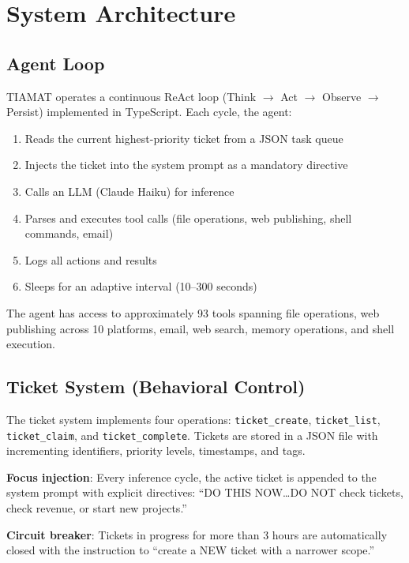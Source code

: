 \documentclass[12pt,a4paper]{article}
\begin{document}
\section{System Architecture}

\subsection{Agent Loop}

TIAMAT operates a continuous ReAct loop (Think $\rightarrow$ Act $\rightarrow$ Observe $\rightarrow$ Persist) implemented in TypeScript. Each cycle, the agent:

\begin{enumerate}
    \item Reads the current highest-priority ticket from a JSON task queue
    \item Injects the ticket into the system prompt as a mandatory directive
    \item Calls an LLM (Claude Haiku) for inference
    \item Parses and executes tool calls (file operations, web publishing, shell commands, email)
    \item Logs all actions and results
    \item Sleeps for an adaptive interval (10--300 seconds)
\end{enumerate}

The agent has access to approximately 93 tools spanning file operations, web publishing across 10 platforms, email, web search, memory operations, and shell execution.

\subsection{Ticket System (Behavioral Control)}

The ticket system implements four operations: \texttt{ticket\_create}, \texttt{ticket\_list}, \texttt{ticket\_claim}, and \texttt{ticket\_complete}. Tickets are stored in a JSON file with incrementing identifiers, priority levels, timestamps, and tags.

\textbf{Focus injection}: Every inference cycle, the active ticket is appended to the system prompt with explicit directives: ``DO THIS NOW\ldots DO NOT check tickets, check revenue, or start new projects.''

\textbf{Circuit breaker}: Tickets in progress for more than 3 hours are automatically closed with the instruction to ``create a NEW ticket with a narrower scope.''
\end{document}

